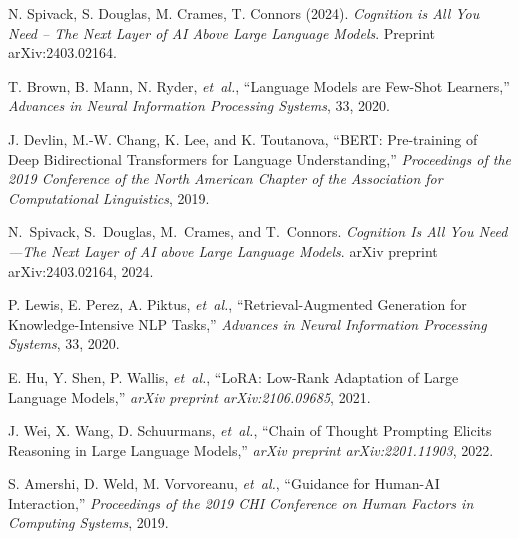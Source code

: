 \documentclass{article}
\begin{document}
\begin{thebibliography}{99}

 N. Spivack, S. Douglas, M. Crames, T. Connors (2024). \textit{Cognition is All You Need -- The Next Layer of AI Above Large Language Models}. Preprint arXiv:2403.02164.

T. Brown, B. Mann, N. Ryder, \emph{et~al.}, ``Language Models are Few-Shot Learners,'' 
\textit{Advances in Neural Information Processing Systems}, 33, 2020.

J. Devlin, M.-W. Chang, K. Lee, and K. Toutanova, ``BERT: Pre-training of Deep Bidirectional Transformers for Language Understanding,''
\textit{Proceedings of the 2019 Conference of the North American Chapter of the Association for Computational Linguistics}, 2019.

N.~Spivack, S.~Douglas, M.~Crames, and T.~Connors.
\newblock \emph{Cognition Is All You Need—The Next Layer of AI above Large Language Models}.
\newblock arXiv preprint arXiv:2403.02164, 2024.

P. Lewis, E. Perez, A. Piktus, \emph{et~al.}, ``Retrieval-Augmented Generation for Knowledge-Intensive NLP Tasks,''
\textit{Advances in Neural Information Processing Systems}, 33, 2020.

E. Hu, Y. Shen, P. Wallis, \emph{et~al.}, ``LoRA: Low-Rank Adaptation of Large Language Models,''
\textit{arXiv preprint arXiv:2106.09685}, 2021.

J. Wei, X. Wang, D. Schuurmans, \emph{et~al.}, ``Chain of Thought Prompting Elicits Reasoning in Large Language Models,''
\textit{arXiv preprint arXiv:2201.11903}, 2022.

S. Amershi, D. Weld, M. Vorvoreanu, \emph{et~al.}, ``Guidance for Human-AI Interaction,''
\textit{Proceedings of the 2019 CHI Conference on Human Factors in Computing Systems}, 2019.
\end{thebibliography}
\end{document}
